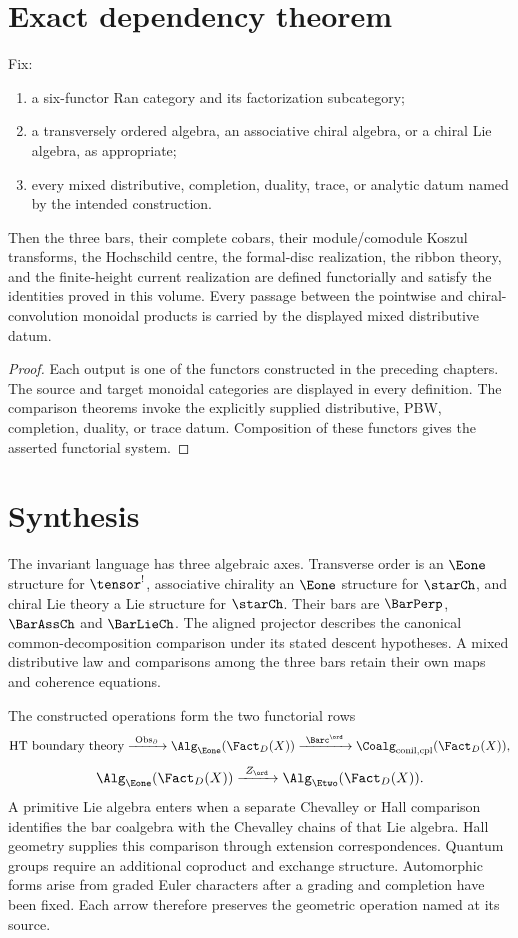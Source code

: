 \chapter{Exact dependency theorem}
\begin{theorem}
Fix:
\begin{enumerate}
\item a six-functor Ran category and its factorization subcategory;
\item a transversely ordered algebra, an associative chiral algebra, or a chiral Lie algebra, as appropriate;
\item every mixed distributive, completion, duality, trace, or analytic datum named by the intended construction.
\end{enumerate}
Then the three bars, their complete cobars, their module/comodule Koszul transforms, the Hochschild centre, the formal-disc realization, the ribbon theory, and the finite-height current realization are defined functorially and satisfy the identities proved in this volume.  Every passage between the pointwise and chiral-convolution monoidal products is carried by the displayed mixed distributive datum.
\end{theorem}
\begin{proof}
Each output is one of the functors constructed in the preceding chapters.  The source and target monoidal categories are displayed in every definition.  The comparison theorems invoke the explicitly supplied distributive, PBW, completion, duality, or trace datum.  Composition of these functors gives the asserted functorial system.
\end{proof}

\chapter{Synthesis}
The invariant language has three algebraic axes. Transverse order is an
$\Eone$ structure for $\tensor^!$, associative chirality an $\Eone$
structure for $\starCh$, and chiral Lie theory a Lie structure for
$\starCh$. Their bars are $\BarPerp$, $\BarAssCh$ and $\BarLieCh$.
The aligned projector describes the canonical common-decomposition
comparison under its stated descent hypotheses.
A mixed distributive law and comparisons among the three bars retain
their own maps and coherence equations.

The constructed operations form the two functorial rows
\[
 \text{HT boundary theory}
 \xrightarrow{\ \mathrm{Obs}_{\partial}\ }
 \Alg_{\Eone}(\Fact_D(X))
 \xrightarrow{\ \Barc^{\ord}\ }
 \Coalg_{\mathrm{conil,cpl}}(\Fact_D(X)),
\]
\[
 \Alg_{\Eone}(\Fact_D(X))
 \xrightarrow{\ Z_{\ord}\ }
 \Alg_{\Etwo}(\Fact_D(X)).
\]
A primitive Lie algebra enters when a separate Chevalley or Hall comparison identifies the bar coalgebra with the Chevalley chains of that Lie algebra. Hall geometry supplies this comparison through extension correspondences. Quantum groups require an additional coproduct and exchange structure. Automorphic forms arise from graded Euler characters after a grading and completion have been fixed. Each arrow therefore preserves the geometric operation named at its source.

